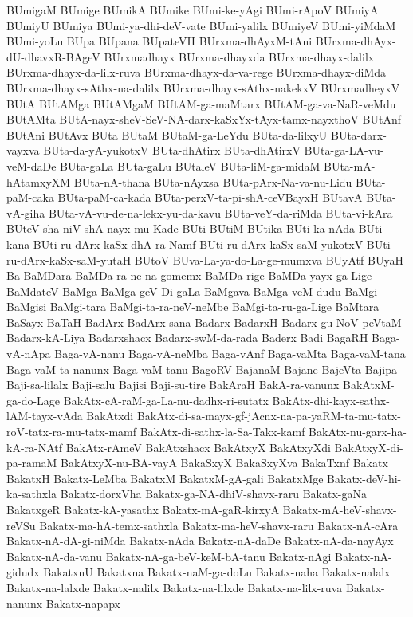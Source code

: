 {BUmigaM
BUmige
BUmikA
BUmike
BUmi-ke-yAgi
BUmi-rApoV
BUmiyA
BUmiyU
BUmiya
BUmi-ya-dhi-deV-vate
BUmi-yalilx
BUmiyeV
BUmi-yiMdaM
BUmi-yoLu
BUpa
BUpana
BUpateVH
BUrxma-dhAyxM-tAni
BUrxma-dhAyx-dU-dhavxR-BAgeV
BUrxmadhayx
BUrxma-dhayxda
BUrxma-dhayx-dalilx
BUrxma-dhayx-da-lilx-ruva
BUrxma-dhayx-da-va-rege
BUrxma-dhayx-diMda
BUrxma-dhayx-sAthx-na-dalilx
BUrxma-dhayx-sAthx-nakekxV
BUrxmadheyxV
BUtA
BUtAMga
BUtAMgaM
BUtAM-ga-maMtarx
BUtAM-ga-va-NaR-veMdu
BUtAMta
BUtA-nayx-sheV-SeV-NA-darx-kaSxYx-tAyx-tamx-nayxthoV
BUtAnf
BUtAni
BUtAvx
BUta
BUtaM
BUtaM-ga-LeYdu
BUta-da-lilxyU
BUta-darx-vayxva
BUta-da-yA-yukotxV
BUta-dhAtirx
BUta-dhAtirxV
BUta-ga-LA-vu-veM-daDe
BUta-gaLa
BUta-gaLu
BUtaleV
BUta-liM-ga-midaM
BUta-mA-hAtamxyXM
BUta-nA-thana
BUta-nAyxsa
BUta-pArx-Na-va-nu-Lidu
BUta-paM-caka
BUta-paM-ca-kada
BUta-perxV-ta-pi-shA-ceVBayxH
BUtavA
BUta-vA-giha
BUta-vA-vu-de-na-lekx-yu-da-kavu
BUta-veY-da-riMda
BUta-vi-kAra
BUteV-sha-niV-shA-nayx-mu-Kade
BUti
BUtiM
BUtika
BUti-ka-nAda
BUti-kana
BUti-ru-dArx-kaSx-dhA-ra-Namf
BUti-ru-dArx-kaSx-saM-yukotxV
BUti-ru-dArx-kaSx-saM-yutaH
BUtoV
BUva-La-ya-do-La-ge-mumxva
BUyAtf
BUyaH
Ba
BaMDara
BaMDa-ra-ne-na-gomemx
BaMDa-rige
BaMDa-yayx-ga-Lige
BaMdateV
BaMga
BaMga-geV-Di-gaLa
BaMgava
BaMga-veM-dudu
BaMgi
BaMgisi
BaMgi-tara
BaMgi-ta-ra-neV-neMbe
BaMgi-ta-ru-ga-Lige
BaMtara
BaSayx
BaTaH
BadArx
BadArx-sana
Badarx
BadarxH
Badarx-gu-NoV-peVtaM
Badarx-kA-Liya
Badarxshacx
Badarx-swM-da-rada
Baderx
Badi
BagaRH
Baga-vA-nApa
Baga-vA-nanu
Baga-vA-neMba
Baga-vAnf
Baga-vaMta
Baga-vaM-tana
Baga-vaM-ta-nanunx
Baga-vaM-tanu
BagoRV
BajanaM
Bajane
BajeVta
Bajipa
Baji-sa-lilalx
Baji-salu
Bajisi
Baji-su-tire
BakAraH
BakA-ra-vanunx
BakAtxM-ga-do-Lage
BakAtx-cA-raM-ga-La-nu-dadhx-ri-sutatx
BakAtx-dhi-kayx-sathx-lAM-tayx-vAda
BakAtxdi
BakAtx-di-sa-mayx-gf-jAcnx-na-pa-yaRM-ta-mu-tatx-roV-tatx-ra-mu-tatx-mamf
BakAtx-di-sathx-la-Sa-Takx-kamf
BakAtx-nu-garx-ha-kA-ra-NAtf
BakAtx-rAmeV
BakAtxshacx
BakAtxyX
BakAtxyXdi
BakAtxyX-di-pa-ramaM
BakAtxyX-nu-BA-vayA
BakaSxyX
BakaSxyXva
BakaTxnf
Bakatx
BakatxH
Bakatx-LeMba
BakatxM
BakatxM-gA-gali
BakatxMge
Bakatx-deV-hi-ka-sathxla
Bakatx-dorxVha
Bakatx-ga-NA-dhiV-shavx-raru
Bakatx-gaNa
BakatxgeR
Bakatx-kA-yasathx
Bakatx-mA-gaR-kirxyA
Bakatx-mA-heV-shavx-reVSu
Bakatx-ma-hA-temx-sathxla
Bakatx-ma-heV-shavx-raru
Bakatx-nA-cAra
Bakatx-nA-dA-gi-niMda
Bakatx-nAda
Bakatx-nA-daDe
Bakatx-nA-da-nayAyx
Bakatx-nA-da-vanu
Bakatx-nA-ga-beV-keM-bA-tanu
Bakatx-nAgi
Bakatx-nA-gidudx
BakatxnU
Bakatxna
Bakatx-naM-ga-doLu
Bakatx-naha
Bakatx-nalalx
Bakatx-na-lalxde
Bakatx-nalilx
Bakatx-na-lilxde
Bakatx-na-lilx-ruva
Bakatx-nanunx
Bakatx-napapx
}
